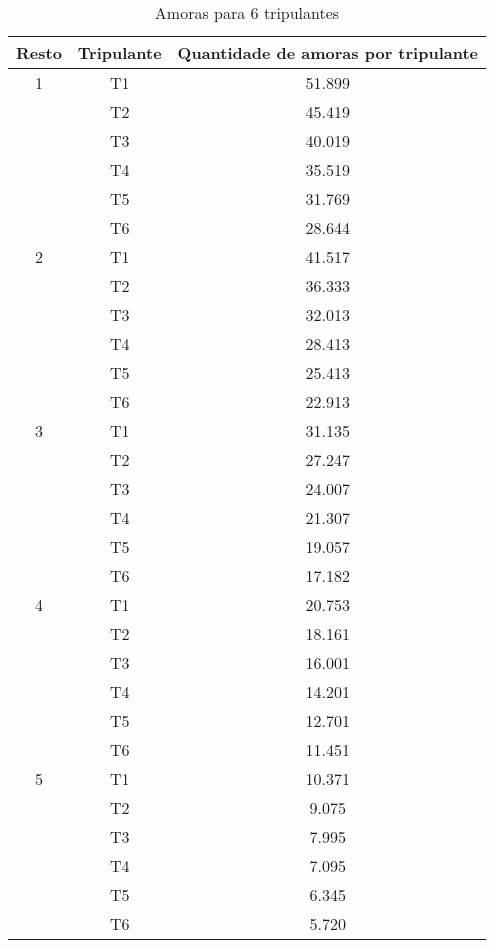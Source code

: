 \documentclass[12pt]{article}
\begin{document}
\begin{table}[H]

\centering

\begin{tabular}{|c|c|c|}

\hline
Resto & Tripulante & Quantidade de amoras por tripulante \\
\hline
1 & T1 & 51.899 \\
\cline{2-3}
& T2 & 45.419 \\
\cline{2-3}
& T3 & 40.019 \\
\cline{2-3}
& T4 & 35.519 \\
\cline{2-3}
& T5 & 31.769 \\
\cline{2-3}
& T6 & 28.644 \\
\hline
2 & T1 & 41.517 \\
\cline{2-3}
& T2 & 36.333 \\
\cline{2-3}
& T3 & 32.013 \\
\cline{2-3}
& T4 & 28.413 \\
\cline{2-3}
& T5 & 25.413 \\
\cline{2-3}
& T6 & 22.913 \\
\hline
3 & T1 & 31.135 \\
\cline{2-3}
& T2 & 27.247 \\
\cline{2-3}
& T3 & 24.007 \\
\cline{2-3}
& T4 & 21.307 \\
\cline{2-3}
& T5 & 19.057 \\
\cline{2-3}
& T6 & 17.182 \\
\hline 
4 & T1 & 20.753 \\
\cline{2-3}
& T2 & 18.161 \\
\cline{2-3}
& T3 & 16.001 \\
\cline{2-3}
& T4 & 14.201 \\
\cline{2-3}
& T5 & 12.701 \\
\cline{2-3}
& T6 & 11.451 \\
\hline
5 & T1 & 10.371 \\
\cline{2-3}
& T2 & 9.075 \\
\cline{2-3}
& T3 & 7.995 \\
\cline{2-3}
& T4 & 7.095 \\
\cline{2-3}
& T5 & 6.345 \\
\cline{2-3}
& T6 & 5.720 \\
\hline

\end{tabular}
\label{Tabela3}
\caption{Amoras para 6 tripulantes}

\end{table}
\end{document}
